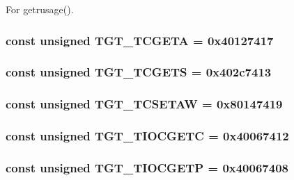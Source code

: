 For getrusage(). \hypertarget{classAlphaTru64_a804fc265279c5dbd78e0f95da998b267}{
\subsubsection[{TGT\_\-TCGETA}]{\setlength{\rightskip}{0pt plus 5cm}const unsigned {\bf TGT\_\-TCGETA} = 0x40127417}}
\label{classAlphaTru64_a804fc265279c5dbd78e0f95da998b267}
\hypertarget{classAlphaTru64_a50e5d880569ec2cb9a2f3d4aaa55cc64}{
\subsubsection[{TGT\_\-TCGETS}]{\setlength{\rightskip}{0pt plus 5cm}const unsigned {\bf TGT\_\-TCGETS} = 0x402c7413}}
\label{classAlphaTru64_a50e5d880569ec2cb9a2f3d4aaa55cc64}
\hypertarget{classAlphaTru64_a96e06e042526ea5e89c4e8a020636c52}{
\subsubsection[{TGT\_\-TCSETAW}]{\setlength{\rightskip}{0pt plus 5cm}const unsigned {\bf TGT\_\-TCSETAW} = 0x80147419}}
\label{classAlphaTru64_a96e06e042526ea5e89c4e8a020636c52}
\hypertarget{classAlphaTru64_ad4f95fbdb4f52f68481c247267675007}{
\subsubsection[{TGT\_\-TIOCGETC}]{\setlength{\rightskip}{0pt plus 5cm}const unsigned {\bf TGT\_\-TIOCGETC} = 0x40067412}}
\label{classAlphaTru64_ad4f95fbdb4f52f68481c247267675007}
\hypertarget{classAlphaTru64_a90fcc56bd4aa74a5d86c87bfeae77625}{
\subsubsection[{TGT\_\-TIOCGETP}]{\setlength{\rightskip}{0pt plus 5cm}const unsigned {\bf TGT\_\-TIOCGETP} = 0x40067408}}
\label{classAlphaTru64_a90fcc56bd4aa74a5d86c87bfeae77625}



